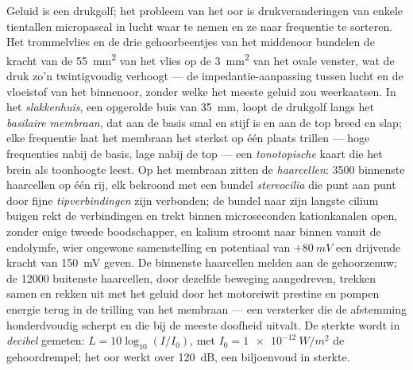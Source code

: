 \begin{definition}\label{def:b3:sensory-systems:cochlea}
Geluid is een drukgolf; het probleem van het oor is drukveranderingen
van enkele tientallen micropascal in lucht waar te nemen en ze naar
frequentie te sorteren. Het trommelvlies en de drie gehoorbeentjes van
het middenoor bundelen de kracht van de \qty{55}{mm^2} van het vlies op
de \qty{3}{mm^2} van het ovale venster, wat de druk zo'n twintigvoudig
verhoogt --- de impedantie-aanpassing tussen lucht en de vloeistof van
het binnenoor, zonder welke het meeste geluid zou weerkaatsen. In het
\emph{slakkenhuis}, een opgerolde buis van \qty{35}{mm}, loopt de
drukgolf langs het \emph{basilaire membraan}, dat aan de basis smal en
stijf is en aan de top breed en slap; elke frequentie laat het membraan
het sterkst op één plaats trillen --- hoge frequenties nabij de basis,
lage nabij de top --- een \emph{tonotopische} kaart die het brein als
toonhoogte leest. Op het membraan zitten de \emph{haarcellen}:
\num{3500} binnenste haarcellen op één rij, elk bekroond met een bundel
\emph{stereocilia} die punt aan punt door fijne
\emph{tipverbindingen} zijn verbonden; de bundel naar zijn langste
cilium buigen rekt de verbindingen en trekt binnen microseconden
kationkanalen open, zonder enige tweede boodschapper, en kalium stroomt
naar binnen vanuit de endolymfe, wier ongewone samenstelling en
potentiaal van $+\qty{80}{mV}$ een drijvende kracht van \qty{150}{mV}
geven. De binnenste haarcellen melden aan de gehoorzenuw; de
\num{12000} buitenste haarcellen, door dezelfde beweging aangedreven,
trekken samen en rekken uit met het geluid door het motoreiwit prestine
en pompen energie terug in de trilling van het membraan --- een
versterker die de afstemming honderdvoudig scherpt en die bij de meeste
doofheid uitvalt. De sterkte wordt in \emph{decibel} gemeten: $L = 10\log_{10}
(I/I_{0})$, met $I_{0} = \qty{1e-12}{W/m^2}$ de gehoordrempel; het oor
werkt over \qty{120}{dB}, een biljoenvoud in sterkte.
\end{definition}

